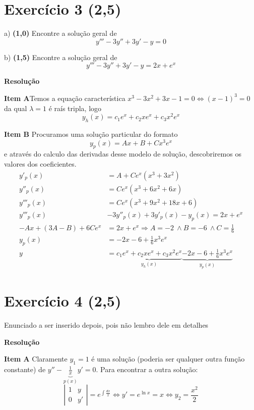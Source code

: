 \documentclass[12pt,openany, letterpaper]{book}
\newcommand{\E}[1]{Exercício #1}
\newcommand{\Resolve}{\begin{center} \textbf{Resolução} \end{center}}
\newcommand{\IT}[1]{Item {#1}}
\begin{document}
{{\newpage

\section*{\E{3} (2,5)}

\hspace{5mm} a) \textbf{(1,0)} Encontre a solução geral de $$y''' - 3y'' + 3y' -y = 0$$

b) \textbf{(1,5)} Encontre a solução geral de $$y''' - 3y'' + 3y' -y = 2x + e^x$$

\Resolve

\textbf{\IT{A}}Temos a equação característica $x^3 - 3x^2 + 3x - 1 = 0 \Longleftrightarrow (x-1)^3 = 0$ da qual $\lambda = 1$ é raís tripla, logo $$y_h(x) = c_1 e^x + c_2 xe^x + c_3x^2e^x$$

\textbf{\IT{B}} Procuramos uma solução particular do formato $$y_p(x) = Ax + B + Cx^3e^x$$ e através do calculo das derivadas desse modelo de solução, descobriremos os valores dos coeficientes. \begin{align*}
    y'_p(x) &= A + Ce^x(x^3 + 3x^2) \\
    y''_p(x) &= Ce^x(x^3 + 6x^2 + 6x) \\
    y'''_p(x) &= Ce^x(x^3 + 9x^2 + 18x + 6) \\
    y'''_p(x) &- 3y''_p(x) + 3 y'_p(x) - y_p(x) = 2x + e^x \\
    -Ax + (3A-B) + 6Ce^x &= 2x + e^x \Rightarrow A = -2 \ \land B = -6 \ \land C = \frac{1}{6} \\
    y_p(x) &= -2x -6 + \frac{1}{6}x^3e^x \\
    y &= \underbrace{c_1 e^x + c_2 xe^x + c_3x^2e^x}_{y_h(x)} \underbrace{-2x -6 + \frac{1}{6}x^3e^x}_{y_p(x)}
\end{align*}

\newpage

\section*{\E{4} (2,5)}{Enunciado a ser inserido depois, pois não lembro dele em detalhes}

\Resolve

\textbf{\IT{A}} Claramente $y_1 = 1$ é uma solução (poderia ser qualquer outra função constante) de $y'' - \underbrace{\frac{1}{x}}_{p(x)}y' = 0$. Para encontrar a outra solução:$$\left|\begin{array}{cc}
1 & y \\
0 & y'
\end{array}\right| = e^{\int \frac{dx}{x}} \Longleftrightarrow y' = e^{\ln x} = x \Longleftrightarrow y_2 = \frac{x^2}{2}$$

}}
\end{document}
